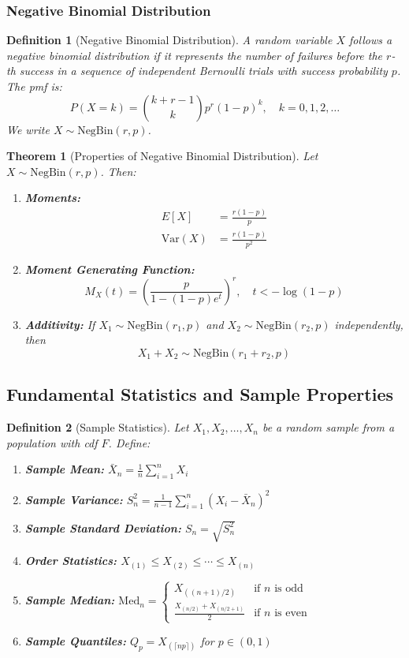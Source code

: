 \documentclass[12pt,a4paper]{article}
\newtheorem{theorem}{Theorem}[section]
\newtheorem{definition}{Definition}[section]
\theoremstyle{remark}
\begin{document}
\subsubsection{Negative Binomial Distribution}

\begin{definition}[Negative Binomial Distribution]
A random variable $X$ follows a negative binomial distribution if it represents the number of failures before the $r$-th success in a sequence of independent Bernoulli trials with success probability $p$. The pmf is:
$$P(X = k) = \binom{k + r - 1}{k} p^r (1-p)^k, \quad k = 0, 1, 2, \ldots$$
We write $X \sim \text{NegBin}(r, p)$.
\end{definition}

\begin{theorem}[Properties of Negative Binomial Distribution]
Let $X \sim \text{NegBin}(r, p)$. Then:
\begin{enumerate}
\item \textbf{Moments:}
   \begin{align}
   E[X] &= \frac{r(1-p)}{p}\\
   \text{Var}(X) &= \frac{r(1-p)}{p^2}
   \end{align}
\item \textbf{Moment Generating Function:}
   $$M_X(t) = \left(\frac{p}{1 - (1-p)e^t}\right)^r, \quad t < -\log(1-p)$$
\item \textbf{Additivity:} If $X_1 \sim \text{NegBin}(r_1, p)$ and $X_2 \sim \text{NegBin}(r_2, p)$ independently, then
   $$X_1 + X_2 \sim \text{NegBin}(r_1 + r_2, p)$$
\end{enumerate}
\end{theorem}

\subsection{Fundamental Statistics and Sample Properties}

\begin{definition}[Sample Statistics]
Let $X_1, X_2, \ldots, X_n$ be a random sample from a population with cdf $F$. Define:
\begin{enumerate}
\item \textbf{Sample Mean:} $\bar{X}_n = \frac{1}{n}\sum_{i=1}^n X_i$
\item \textbf{Sample Variance:} $S_n^2 = \frac{1}{n-1}\sum_{i=1}^n (X_i - \bar{X}_n)^2$
\item \textbf{Sample Standard Deviation:} $S_n = \sqrt{S_n^2}$
\item \textbf{Order Statistics:} $X_{(1)} \leq X_{(2)} \leq \cdots \leq X_{(n)}$
\item \textbf{Sample Median:} $\text{Med}_n = \begin{cases} X_{((n+1)/2)} & \text{if } n \text{ is odd}\\ \frac{X_{(n/2)} + X_{(n/2+1)}}{2} & \text{if } n \text{ is even} \end{cases}$
\item \textbf{Sample Quantiles:} $Q_p = X_{(\lceil np \rceil)}$ for $p \in (0,1)$
\end{enumerate}
\end{definition}
\end{document}
